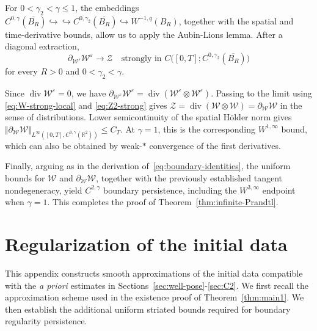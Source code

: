 \documentclass[reqno,11pt,a4paper]{amsart}
\begin{document}
For $0<\gamma_2<\gamma\leq1$, the embeddings
$C^{0,\gamma}(\overline{B_R})
  \hookrightarrow\hookrightarrow
  C^{0,\gamma_2}(\overline{B_R})
  \hookrightarrow W^{-1,q}(B_R)$,
together with the spatial and time-derivative bounds,
allow us to apply the Aubin-Lions lemma.
After a diagonal extraction,
\begin{equation}\label{eq:Z2-strong}
  \partial_{\mathcal W^\varepsilon}\mathcal W^\varepsilon
  \longrightarrow\mathcal Z
  \quad\text{strongly in }
  C\bigl([0,T];C^{0,\gamma_2}(\overline{B_R})\bigr)
\end{equation}
for every $R>0$ and $0<\gamma_2<\gamma$.

Since $\operatorname{div}\mathcal W^\varepsilon=0$, we have
$ \partial_{\mathcal W^\varepsilon}\mathcal W^\varepsilon
  =
  \operatorname{div}
  (\mathcal W^\varepsilon\otimes\mathcal W^\varepsilon)$.
Passing to the limit using
\eqref{eq:W-strong-local} and \eqref{eq:Z2-strong} gives $\mathcal Z
  =
  \operatorname{div}(\mathcal W\otimes\mathcal W)
  =
  \partial_{\mathcal W}\mathcal W$ 
in the sense of distributions.
Lower semicontinuity of the spatial H\"older norm gives $\Vert \partial_{\mathcal W}\mathcal W
    \Vert _{L^\infty([0,T],C^{0,\gamma}(\mathbb R^2))}
  \leq C_T$. 
At $\gamma=1$, this is the corresponding
$W^{1,\infty}$ bound, which can also be obtained
by weak-$*$ convergence of the first derivatives.


Finally, arguing as in the derivation of~\eqref{eq:boundary-identities},  the uniform bounds for $\mathcal W$ and
$\partial_{\mathcal W}\mathcal W$,
together with the previously established tangent
nondegeneracy, yield $C^{2,\gamma}$ boundary persistence,
including the $W^{3,\infty}$ endpoint when $\gamma=1$.
This completes the proof of
Theorem~\ref{thm:infinite-Prandtl}.

\appendix
{}

\section{Regularization of the initial data}\label{sec:A}

This appendix constructs smooth approximations
of the initial data compatible with the {\it{a priori}} estimates
in Sections~\ref{sec:well-pose}-\ref{sec:C2}.
We first recall the approximation scheme used
in the existence proof of Theorem~\ref{thm:main1}.
We then establish the additional uniform striated bounds
required for boundary regularity persistence.
\end{document}
